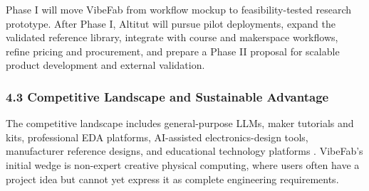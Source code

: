 Phase I will move VibeFab from workflow mockup to feasibility-tested research prototype. After Phase I, Altitut will pursue pilot deployments, expand the validated reference library, integrate with course and makerspace workflows, refine pricing and procurement, and prepare a Phase II proposal for scalable product development and external validation.

\subsubsection*{4.3 Competitive Landscape and Sustainable Advantage}

The competitive landscape includes general-purpose LLMs, maker tutorials and kits, professional EDA platforms, AI-assisted electronics-design tools, manufacturer reference designs, and educational technology platforms \cite{srinivasan2026pcbgenai,flux2026copilot,circuitmind2025product,quilter2026product,altium2025activebom,cadence2025orcad,siemens2025xcelerator}. VibeFab's initial wedge is non-expert creative physical computing, where users often have a project idea but cannot yet express it as complete engineering requirements.

\begin{table}[H]
\centering
\caption{Competitive landscape and VibeFab differentiation.}
\label{tab:competitive_landscape}
\small
{}
\end{table}

